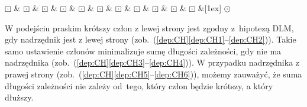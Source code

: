 \documentclass[licencjacka]{pracamgr_Kogni}
\begin{document}
\begin{exe}
\begin{enumerate}[label=\alph{enumi}., ref=\alph{enumi}]
\begin{dependency}[baseline=-3pt, hide label, edge height=.5em]
              \begin{deptext}[column sep=.1ex]
                $\boxdot$ \& $\boxdot$ \& $\boxdot$ \& $\boxdot$ \& $\boxdot$ \& $\boxdot$ \& $\boxdot$ \& $\boxdot$ \& $\boxdot$ \& $\boxdot$ \& $\boxdot$ \&[1ex] $\odot$ \\
              \end{deptext}
            \end{dependency}
            \label{dep:MH6}
        \end{enumerate}
    \end{exe}

    W podejściu praskim krótszy człon z lewej strony jest zgodny z~hipotezą DLM, gdy nadrzędnik jest z lewej strony (zob.~(\ref{dep:CH}\ref{dep:CH1}--\ref{dep:CH2})).
    Takie samo ustawienie członów minimalizuje sumę długości zależności, gdy nie ma nadrzędnika (zob.~(\ref{dep:CH}\ref{dep:CH3}--\ref{dep:CH4})).
    W przypadku nadrzędnika z prawej strony (zob.~(\ref{dep:CH}\ref{dep:CH5}--\ref{dep:CH6})), możemy zauważyć, że suma długości zależności nie zależy od~tego, który człon będzie krótszy, a który dłuższy.
\end{document}
